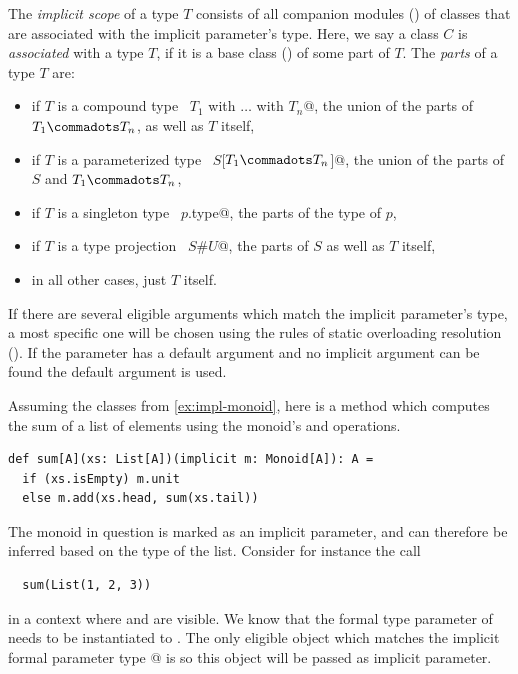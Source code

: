 The {\em implicit scope} of a type $T$ consists of all companion modules
() of classes that are associated with the
implicit parameter's type.  Here, we say a class $C$ is {\em
associated} with a type $T$, if it is a base class
() of some part of $T$.  The {\em parts} of a
type $T$ are:
\begin{itemize}
\item
if $T$ is a compound type ~\lstinline@$T_1$ with $\ldots$ with $T_n$@, the
union of the parts of $T_1 \commadots T_n$, as well as $T$ itself,
\item
if $T$ is a parameterized type ~\lstinline@$S$[$T_1 \commadots T_n$]@, 
the union of the parts of $S$ and $T_1 \commadots T_n$,
\item
if $T$ is a singleton type ~\lstinline@$p$.type@, the parts of the type
of $p$,
\item
if $T$ is a type projection ~\lstinline@$S$#$U$@, the parts of $S$ as
well as $T$ itself,
\item
in all other cases, just $T$ itself.
\end{itemize}

If there are several eligible arguments which match the implicit
parameter's type, a most specific one will be chosen using the rules
of static overloading resolution ().
If the parameter has a default argument and no implicit argument can
be found the default argument is used.

\example Assuming the classes from \ref{ex:impl-monoid}, here is a 
method which computes the sum of a list of elements using the
monoid's  and  operations.
\begin{lstlisting}
def sum[A](xs: List[A])(implicit m: Monoid[A]): A = 
  if (xs.isEmpty) m.unit
  else m.add(xs.head, sum(xs.tail))
\end{lstlisting}
The monoid in question is marked as an implicit parameter, and can therefore
be inferred based on the type of the list.
Consider for instance the call 
\begin{lstlisting}
  sum(List(1, 2, 3))
\end{lstlisting}
in a context where \lstinline@stringMonoid@ and \lstinline@intMonoid@
are visible.  We know that the formal type parameter \lstinline@a@ of
\lstinline@sum@ needs to be instantiated to \lstinline@Int@. The only
eligible object which matches the implicit formal parameter type
\lstinline@Monoid[Int]@ is \lstinline@intMonoid@ so this object will
be passed as implicit parameter.\bigskip

